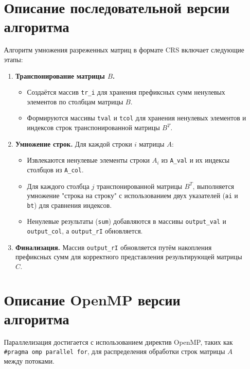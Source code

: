 \documentclass[a4paper,12pt]{article}
\begin{document}
\section{Описание последовательной версии алгоритма}
Алгоритм умножения разреженных матриц в формате CRS включает следующие этапы:
\begin{enumerate}
    \item \textbf{Транспонирование матрицы \( B \).}
    \begin{itemize}
        \item Создаётся массив \texttt{tr\_i} для хранения префиксных сумм ненулевых элементов по столбцам матрицы \( B \).
        \item Формируются массивы \texttt{tval} и \texttt{tcol} для хранения ненулевых элементов и индексов строк транспонированной матрицы \( B^T \).
    \end{itemize}
    \item \textbf{Умножение строк.} Для каждой строки \( i \) матрицы \( A \):
    \begin{itemize}
        \item Извлекаются ненулевые элементы строки \( A_i \) из \texttt{A\_val} и их индексы столбцов из \texttt{A\_col}.
        \item Для каждого столбца \( j \) транспонированной матрицы \( B^T \), выполняется умножение "строка на строку" с использованием двух указателей (\texttt{ai} и \texttt{bt}) для сравнения индексов.
        \item Ненулевые результаты (\texttt{sum}) добавляются в массивы \texttt{output\_val} и \texttt{output\_col}, а \texttt{output\_rI} обновляется.
    \end{itemize}
    \item \textbf{Финализация.} Массив \texttt{output\_rI} обновляется путём накопления префиксных сумм для корректного представления результирующей матрицы \( C \).
\end{enumerate}

\section{Описание OpenMP версии алгоритма}
Параллелизация достигается с использованием директив OpenMP, таких как \texttt{\#pragma omp parallel for}, для распределения обработки строк матрицы \( A \) между потоками.
\end{document}
